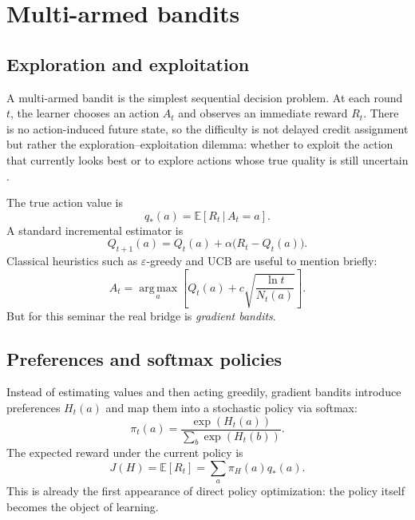 \documentclass[11pt]{article}
\newcommand{\E}{\mathbb{E}}
\newcommand{\1}{\mathbf{1}}
\newcommand{\given}{\,|\,}
\newcommand{\argmax}{\operatorname*{arg\,max}}
\newcommand{\eps}{\varepsilon}
\begin{document}
\section{Multi-armed bandits}

\subsection{Exploration and exploitation}

A multi-armed bandit is the simplest sequential decision problem. At each round $t$, the learner chooses an action $A_t$ and observes an immediate reward $R_t$. There is no action-induced future state, so the difficulty is not delayed credit assignment but rather the exploration--exploitation dilemma: whether to exploit the action that currently looks best or to explore actions whose true quality is still uncertain \cite{SuttonBarto2018}.

The true action value is
\begin{equation}
q_*(a)=\E[R_t \given A_t=a].
\end{equation}
A standard incremental estimator is
\begin{equation}
Q_{t+1}(a)=Q_t(a)+\alpha\bigl(R_t-Q_t(a)\bigr).
\end{equation}
Classical heuristics such as $\eps$-greedy and UCB are useful to mention briefly:
\begin{equation}
A_t = \argmax_a\left[Q_t(a)+c\sqrt{\frac{\ln t}{N_t(a)}}\right].
\end{equation}
But for this seminar the real bridge is \emph{gradient bandits}.

\subsection{Preferences and softmax policies}

Instead of estimating values and then acting greedily, gradient bandits introduce preferences $H_t(a)$ and map them into a stochastic policy via softmax:
\begin{equation}
\pi_t(a)=\frac{\exp(H_t(a))}{\sum_b \exp(H_t(b))}.
\end{equation}
The expected reward under the current policy is
\begin{equation}
J(H)=\E[R_t]=\sum_a \pi_H(a)q_*(a).
\end{equation}
This is already the first appearance of direct policy optimization: the policy itself becomes the object of learning.
\end{document}
